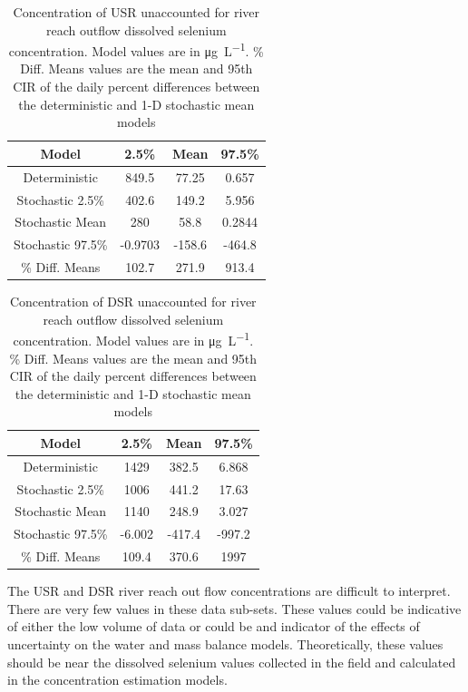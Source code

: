 \begin{linenumbers}
\begin{table}[htbp]
\centering
\caption[Concentration of USR unaccounted for river reach outflow dissolved selenium concentration.]{Concentration of USR unaccounted for river reach outflow dissolved selenium concentration.  Model values are in \si{\micro\gram\per\liter}.  \% Diff. Means values are the mean and 95th CIR of the daily percent differences between the deterministic and 1-D stochastic mean models}
\label{tab:USRUnknownCout}
\begin{tabular}{c|ccc}
	\toprule
	Model& 2.5\% & Mean & 97.5\% \\
	\midrule
	\midrule
	Deterministic&		849.5&	77.25&	0.657\\
	\midrule			                               
	Stochastic 2.5\%&	402.6&	149.2&	5.956\\ 
	Stochastic Mean&	280&	58.8&	0.2844\\
	Stochastic 97.5\%&	-0.9703&-158.6&	-464.8\\
	\midrule                                           
	\% Diff. Means &	102.7&	271.9&	913.4\\
	\bottomrule
\end{tabular}
\end{table}

\begin{table}[htbp]
\centering
\caption[Concentration of DSR unaccounted for river reach outflow dissolved selenium concentration.]{Concentration of DSR unaccounted for river reach outflow dissolved selenium concentration. Model values are in \si{\micro\gram\per\liter}.  \% Diff. Means values are the mean and 95th CIR of the daily percent differences between the deterministic and 1-D stochastic mean models}
\label{tab:DSRUnknownCout}
\begin{tabular}{c|ccc}
	\toprule
	Model& 2.5\% & Mean & 97.5\% \\
	\midrule
	\midrule
	Deterministic&		1429&	382.5&	6.868\\
	\midrule			                               
	Stochastic 2.5\%&	1006&	441.2&	17.63 \\
	Stochastic Mean&	1140&	248.9&	3.027 \\
	Stochastic 97.5\%&	-6.002&	-417.4&	-997.2\\
	\midrule               
	\% Diff. Means &	109.4&	370.6&	1997\\
	\bottomrule
\end{tabular}
\end{table}

The USR and DSR river reach out flow concentrations are difficult to interpret.  There are very few values in these data sub-sets.  These values could be indicative of either the low volume of data or could be and indicator of the effects of uncertainty on the water and mass balance models.  Theoretically, these values should be near the dissolved selenium values collected in the field and calculated in the concentration estimation models.  


\end{linenumbers}
